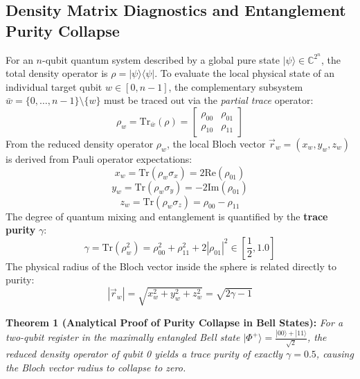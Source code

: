 \documentclass[conference]{IEEEtran}
\begin{document}
\subsection{Density Matrix Diagnostics and Entanglement Purity Collapse}
For an $n$-qubit quantum system described by a global pure state $|\psi\rangle \in \mathbb{C}^{2^n}$, the total density operator is $\rho = |\psi\rangle\langle\psi|$. To evaluate the local physical state of an individual target qubit $w \in [0, n-1]$, the complementary subsystem $\bar{w} = \{0, \dots, n-1\} \setminus \{w\}$ must be traced out via the \textit{partial trace} operator:
\begin{equation}
\rho_w = \text{Tr}_{\bar{w}}(\rho) = \begin{bmatrix} \rho_{00} & \rho_{01} \\ \rho_{10} & \rho_{11} \end{bmatrix}
\end{equation}
From the reduced density operator $\rho_w$, the local Bloch vector $\vec{r}_w = (x_w, y_w, z_w)$ is derived from Pauli operator expectations:
\begin{equation}
x_w = \text{Tr}(\rho_w \sigma_x) = 2\text{Re}(\rho_{01})
\end{equation}
\begin{equation}
y_w = \text{Tr}(\rho_w \sigma_y) = -2\text{Im}(\rho_{01})
\end{equation}
\begin{equation}
z_w = \text{Tr}(\rho_w \sigma_z) = \rho_{00} - \rho_{11}
\end{equation}
The degree of quantum mixing and entanglement is quantified by the \textbf{trace purity} $\gamma$:
\begin{equation}
\gamma = \text{Tr}(\rho_w^2) = \rho_{00}^2 + \rho_{11}^2 + 2|\rho_{01}|^2 \in \left[ \frac{1}{2}, 1.0 \right]
\end{equation}
The physical radius of the Bloch vector inside the sphere is related directly to purity:
\begin{equation}
|\vec{r}_w| = \sqrt{x_w^2 + y_w^2 + z_w^2} = \sqrt{2\gamma - 1}
\end{equation}

\noindent\textbf{Theorem 1 (Analytical Proof of Purity Collapse in Bell States):} \textit{For a two-qubit register in the maximally entangled Bell state $|\Phi^+\rangle = \frac{|00\rangle + |11\rangle}{\sqrt{2}}$, the reduced density operator of qubit 0 yields a trace purity of exactly $\gamma = 0.5$, causing the Bloch vector radius to collapse to zero.}
\end{document}
